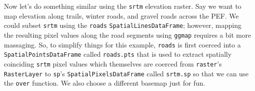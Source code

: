 \documentclass[
]{krantz}
\makeatletter
\newenvironment{Shaded}{\begin{snugshade}}{\end{snugshade}}
\newcommand{\DataTypeTok}[1]{\textcolor[rgb]{0.27,0.27,0.27}{#1}}
\newcommand{\DecValTok}[1]{\textcolor[rgb]{0.06,0.06,0.06}{#1}}
\newcommand{\ErrorTok}[1]{\textcolor[rgb]{0.14,0.14,0.14}{\textbf{#1}}}
\newcommand{\KeywordTok}[1]{\textcolor[rgb]{0.27,0.27,0.27}{\textbf{#1}}}
\newcommand{\NormalTok}[1]{#1}
\newcommand{\OperatorTok}[1]{\textcolor[rgb]{0.43,0.43,0.43}{\textbf{#1}}}
\newcommand{\StringTok}[1]{\textcolor[rgb]{0.5,0.5,0.5}{#1}}
\newenvironment{kframe}{%
\medskip{}
\setlength{\fboxsep}{.8em}
 \def\at@end@of@kframe{}%
 \ifinner\ifhmode%
  \def\at@end@of@kframe{\end{minipage}}%
  \begin{minipage}{\columnwidth}%
 \fi\fi%
 \def\FrameCommand##1{\hskip\@totalleftmargin \hskip-\fboxsep
 \colorbox{shadecolor}{##1}\hskip-\fboxsep
     \hskip-\linewidth \hskip-\@totalleftmargin \hskip\columnwidth}%
 \MakeFramed {\advance\hsize-\width
   \@totalleftmargin\z@ \linewidth\hsize
   \@setminipage}}%
 {\par\unskip\endMakeFramed%
 \at@end@of@kframe}
\renewenvironment{Shaded}{\begin{kframe}}{\end{kframe}}
\makeatother
\begin{document}
Now let's do something similar using the \texttt{srtm} elevation raster. Say we want to map elevation along trails, winter roads, and gravel roads across the PEF. We could subset \texttt{srtm} using the \texttt{roads} \texttt{SpatialLinesDataFrame}; however, mapping the resulting pixel values along the road segments using \texttt{ggmap} requires a bit more massaging. So, to simplify things for this example, \texttt{roads} is first coerced into a \texttt{SpatialPointsDataFrame} called \texttt{roads.pts} that is used to extract spatially coinciding \texttt{srtm} pixel values which themselves are coerced from \texttt{raster}'s \texttt{RasterLayer} to \texttt{sp}'s \texttt{SpatialPixelsDataFrame} called \texttt{srtm.sp} so that we can use the \texttt{over} function. We also choose a different basemap just for fun.

\begin{Shaded}
\end{Shaded}
\end{document}
